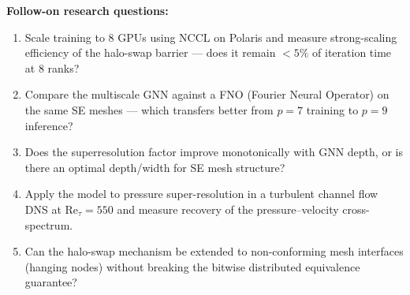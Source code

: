 \documentclass[11pt]{article}
\begin{document}
\noindent\textbf{Follow-on research questions:}
\begin{enumerate}[leftmargin=1.6em,itemsep=0.2em,topsep=0.2em,label=Q\arabic*.]
\item Scale training to 8 GPUs using NCCL on Polaris and measure strong-scaling efficiency of the halo-swap barrier --- does it remain $<5\%$ of iteration time at 8 ranks?
\item Compare the multiscale GNN against a FNO (Fourier Neural Operator) on the same SE meshes --- which transfers better from $p=7$ training to $p=9$ inference?
\item Does the superresolution factor improve monotonically with GNN depth, or is there an optimal depth/width for SE mesh structure?
\item Apply the model to pressure super-resolution in a turbulent channel flow DNS at $\mathrm{Re}_\tau=550$ and measure recovery of the pressure--velocity cross-spectrum.
\item Can the halo-swap mechanism be extended to non-conforming mesh interfaces (hanging nodes) without breaking the bitwise distributed equivalence guarantee?
\end{enumerate}
\end{document}

